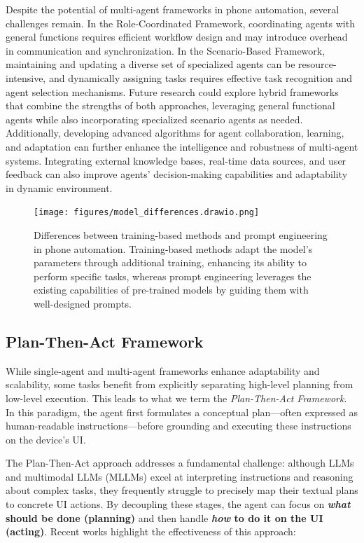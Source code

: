 Despite the potential of multi-agent frameworks in phone automation, several challenges remain. In the Role-Coordinated Framework, coordinating agents with general functions requires efficient workflow design and may introduce overhead in communication and synchronization. In the Scenario-Based Framework, maintaining and updating a diverse set of specialized agents can be resource-intensive, and dynamically assigning tasks requires effective task recognition and agent selection mechanisms. Future research could explore hybrid frameworks that combine the strengths of both approaches, leveraging general functional agents while also incorporating specialized scenario agents as needed. Additionally, developing advanced algorithms for agent collaboration, learning, and adaptation can further enhance the intelligence and robustness of multi-agent systems. Integrating external knowledge bases, real-time data sources, and user feedback can also improve agents' decision-making capabilities and adaptability in dynamic environment.

\begin{figure}[ht] 
    \centering 
    \texttt{[image: figures/model\_differences.drawio.png]} 
    \caption{Differences between training-based methods and prompt engineering in phone automation. Training-based methods adapt the model's parameters through additional training, enhancing its ability to perform specific tasks, whereas prompt engineering leverages the existing capabilities of pre-trained models by guiding them with well-designed prompts. } 
    \label{fig:model_differences} 
\end{figure}

\subsection{Plan-Then-Act Framework}
\label{subsec:plan_then_act}

While single-agent and multi-agent frameworks enhance adaptability and scalability, some tasks benefit from explicitly separating high-level planning from low-level execution. This leads to what we term the \textit{Plan-Then-Act Framework}. In this paradigm, the agent first formulates a conceptual plan—often expressed as human-readable instructions—before grounding and executing these instructions on the device’s UI.

The Plan-Then-Act approach addresses a fundamental challenge: although LLMs and multimodal LLMs (MLLMs) excel at interpreting instructions and reasoning about complex tasks, they frequently struggle to precisely map their textual plans to concrete UI actions. By decoupling these stages, the agent can focus on \textbf{\emph{what} should be done (planning)} and then handle \textbf{\emph{how} to do it on the UI (acting)}. Recent works highlight the effectiveness of this approach:


